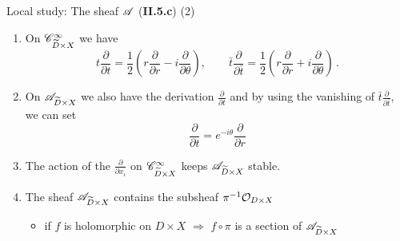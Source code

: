 \begin{frame}[t]{Local study: The sheaf $\mathscr{A}$ (\textbf{II.5.c}) (2)}
  \begin{enumerate}
    \item On $\mathscr{C}_{\widetilde D\times X}^\infty$ we have
      \[
        t\frac{\partial}{\partial t}=
          \frac{1}{2}\left(r\frac{\partial}{\partial r}
          -i\frac{\partial}{\partial\theta} \right),
        \qquad
        \bar t\frac{\partial}{\partial\bar t}=
          \frac{1}{2}\left(r\frac{\partial}{\partial r}
          +i\frac{\partial}{\partial\theta} \right)\,.
      \]
    \item On $\mathscr{A}_{\widetilde D\times X}$ we also have the derivation
      $\frac{\partial}{\partial t}$ and by using the vanishing of
      $\bar t\frac{\partial}{\partial\bar t}$, we can set
      \[
        \frac{\partial}{\partial t}=e^{-i\theta}\frac{\partial}{\partial r}
      \]
    \item The action of the $\frac{\partial}{\partial x_i}$ on
      $\mathscr{C}_{\widetilde D\times X}^\infty$ keeps $\mathscr{A}_{\widetilde D\times X}$ stable.
    \item The sheaf $\mathscr{A}_{\widetilde D\times X}$ contains the subsheaf
      $\pi^{-1}\mathcal{O}_{D\times X}$
      \begin{itemize}
        \item if $f$ is holomorphic on $D\times X$ $\Rightarrow$ $f\circ\pi$ is
          a section of $\mathscr{A}_{\widetilde D\times X}$
      \end{itemize}
  \end{enumerate}
\end{frame}


